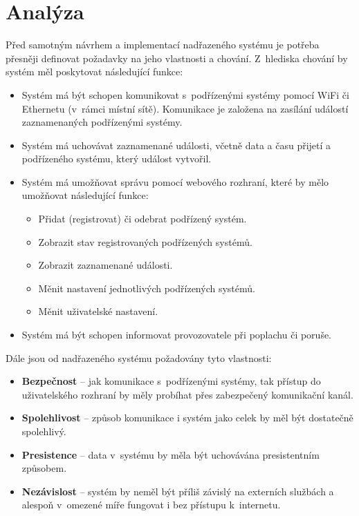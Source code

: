 \chapter{Analýza}
\label{sec:an}

Před samotným návrhem a implementací nadřazeného systému je potřeba přesněji definovat požadavky na jeho vlastnosti a chování. Z~hlediska chování by systém měl poskytovat následující funkce:

\begin{itemize}
    \item Systém má být schopen komunikovat s~podřízenými systémy pomocí WiFi či Ethernetu (v~rámci místní sítě). Komunikace je založena na zasílání událostí zaznamenaných podřízenými systémy.
    \item Systém má uchovávat zaznamenané události, včetně data a času přijetí a podřízeného systému, který událost vytvořil.
    \item Systém má umožňovat správu pomocí webového rozhraní, které by mělo umožňovat následující funkce:
        \begin{itemize}
            \item Přidat (registrovat) či odebrat podřízený systém.
            \item Zobrazit stav registrovaných podřízených systémů.
            \item Zobrazit zaznamenané události.
            \item Měnit nastavení jednotlivých podřízených systémů.
            \item Měnit uživatelské nastavení.
        \end{itemize}
    \item Systém má být schopen informovat provozovatele při poplachu či poruše.
\end{itemize}

Dále jsou od nadřazeného systému požadovány tyto vlastnosti:

\begin{itemize}
    \item \textbf{Bezpečnost} -- jak komunikace s~podřízenými systémy, tak přístup do uživatelského rozhraní by měly probíhat přes zabezpečený komunikační kanál.
    \item \textbf{Spolehlivost} -- způsob komunikace i systém jako celek by měl být dostatečně spolehlivý.
    \item \textbf{Presistence} -- data v~systému by měla být uchovávána presistentním způsobem.
    \item \textbf{Nezávislost} -- systém by neměl být příliš závislý na externích službách a alespoň v~omezené míře fungovat i bez přístupu k~internetu.
\end{itemize}

